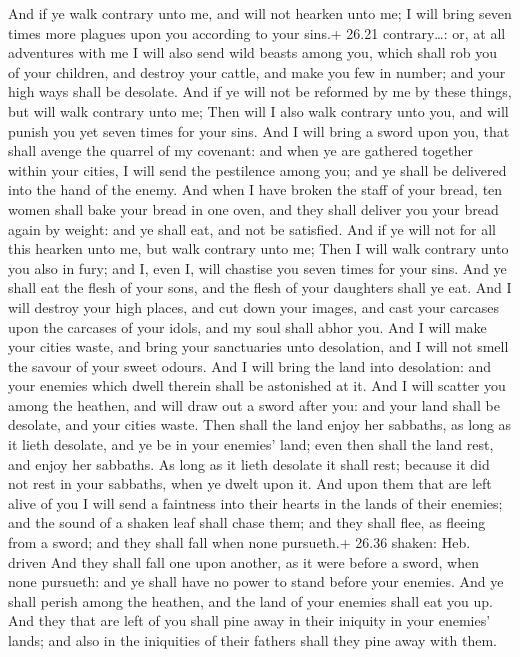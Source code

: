  And if ye walk contrary unto me, and will not hearken
unto me; I will bring seven times more plagues upon you according to
your sins.+ 26.21 contrary\ldots: or, at all adventures with me
 I will also send wild beasts among you, which shall rob
you of your children, and destroy your cattle, and make you few in
number; and your high ways shall be desolate.  And if ye
will not be reformed by me by these things, but will walk contrary unto
me;  Then will I also walk contrary unto you, and will
punish you yet seven times for your sins.  And I will bring
a sword upon you, that shall avenge the quarrel of my covenant: and when
ye are gathered together within your cities, I will send the pestilence
among you; and ye shall be delivered into the hand of the enemy.
 And when I have broken the staff of your bread, ten women
shall bake your bread in one oven, and they shall deliver you your bread
again by weight: and ye shall eat, and not be satisfied. 
And if ye will not for all this hearken unto me, but walk contrary unto
me;  Then I will walk contrary unto you also in fury; and
I, even I, will chastise you seven times for your sins. 
And ye shall eat the flesh of your sons, and the flesh of your daughters
shall ye eat.  And I will destroy your high places, and cut
down your images, and cast your carcases upon the carcases of your
idols, and my soul shall abhor you.  And I will make your
cities waste, and bring your sanctuaries unto desolation, and I will not
smell the savour of your sweet odours.  And I will bring
the land into desolation: and your enemies which dwell therein shall be
astonished at it.  And I will scatter you among the
heathen, and will draw out a sword after you: and your land shall be
desolate, and your cities waste.  Then shall the land enjoy
her sabbaths, as long as it lieth desolate, and ye be in your enemies'
land; even then shall the land rest, and enjoy her sabbaths.
 As long as it lieth desolate it shall rest; because it did
not rest in your sabbaths, when ye dwelt upon it.  And upon
them that are left alive of you I will send a faintness into their
hearts in the lands of their enemies; and the sound of a shaken leaf
shall chase them; and they shall flee, as fleeing from a sword; and they
shall fall when none pursueth.+ 26.36 shaken: Heb. driven 
And they shall fall one upon another, as it were before a sword, when
none pursueth: and ye shall have no power to stand before your enemies.
 And ye shall perish among the heathen, and the land of
your enemies shall eat you up.  And they that are left of
you shall pine away in their iniquity in your enemies' lands; and also
in the iniquities of their fathers shall they pine away with them.

